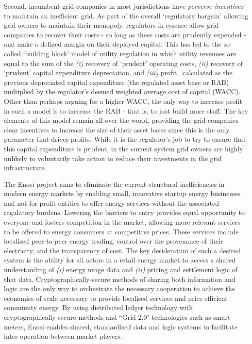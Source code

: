 \documentclass[a4paper,12pt,reqno]{amsart}
\theoremstyle{definition}
\begin{document}
Second, incumbent grid companies in most jurisdictions have \textit{perverse incentives} to maintain an inefficient grid. As part of the overall `regulatory bargain' allowing grid owners to maintain their monopoly, regulators in essence allow grid companies to recover their costs -  so long as these costs are prudently expended - and make a defined margin on their deployed capital. This has led to the so-called `building block' model of utility regulation in which utility revenues are equal to the sum of the \textit{(i)} recovery of `prudent' operating costs, \textit{(ii)} recovery of `prudent' capital expenditure depreciation, and \textit{(iii)} profit \textemdash\, calculated as the previous depreciated capital expenditure (the regulated asset base or RAB) multiplied by the regulator's deemed weighted average cost of capital (WACC). Other than perhaps arguing for a higher WACC, the only way to increase profit in such a model is to increase the RAB - that is, to just build more stuff. The key elements of this model remain all over the world, providing the grid companies clear incentives to increase the size of their asset bases since this is the only parameter that drives profits. While it is the regulator's job to try to ensure that this capital expenditure is prudent, in the current system grid owners are highly unlikely to voluntarily take action to reduce their investments in the grid infrastructure.

The Enosi project aims to eliminate the current structural inefficiencies in modern energy markets by enabling small, innovative startup energy businesses and not-for-profit entities to offer energy services without the associated regulatory burdens. Lowering the barriers to entry provides equal opportunity to everyone and fosters competition in the market, allowing more relevant services to be offered to energy consumers at competitive prices. These services include localised peer-to-peer energy trading, control over the provenance of their electricity, and the transparency of cost. The key desideratum of such a desired system is the ability for all actors in a retail energy market to access a shared understanding of \textit{(i)} energy usage data and \textit{(ii)} pricing and settlement logic of that data. Cryptographically-secure methods of sharing both information and logic are the only way to orchestrate the necessary cooperation to achieve the economies of scale necessary to provide localised services and price-efficient community energy. By using distributed ledger technology with cryptographically-secure methods and ``Grid 2.0" technologies such as smart meters, Enosi enables shared, standardised data and logic systems to facilitate inter-operation between market players. 
\end{document}
